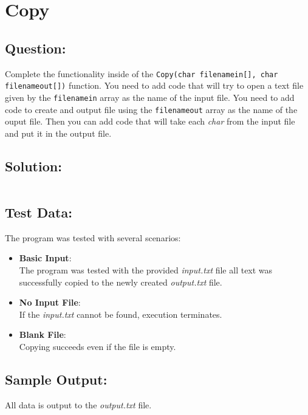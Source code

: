 \documentclass[Lab-C.tex]{subfiles}
\begin{document}
    \section{Copy}
        \subsection*{Question:}
        Complete the functionality inside of the \texttt{Copy(char filenamein[], char filenameout[])} function. 
        You need to add code that will try to open a text file given by the \texttt{filenamein} array as the name of the input file. 
        You need to add code to create and output file using the \texttt{filenameout} array as the name of the ouput file. 
        Then you can add code that will take each \textit{char} from the input file and put it in the output file.
            
        \subsection*{Solution:}
            \inputminted{cpp}{../02-Copy/Copy.cpp}%

        \subsection*{Test Data:}
            The program was tested with several scenarios:
            \begin{itemize}
                \item \textbf{Basic Input}:\\
                    The program was tested with the provided \textit{input.txt} file
                    all text was successfully copied to the newly created \textit{output.txt} file.
                
                \item \textbf{No Input File}:\\
                    If the \textit{input.txt} cannot be found, execution terminates.
                    
                \item \textbf{Blank File}:\\
                    Copying succeeds even if the file is empty.
            \end{itemize}
        
        \subsection*{Sample Output:}
            All data is output to the \textit{output.txt} file.
\end{document}
